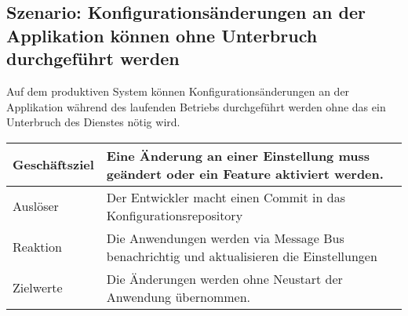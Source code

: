 \subsection{Szenario: Konfigurationsänderungen an der Applikation können ohne Unterbruch durchgeführt werden}

Auf dem produktiven System können Konfigurationsänderungen an der Applikation während des laufenden Betriebs durchgeführt werden ohne das ein Unterbruch des Dienstes nötig wird.

\begin{table}[H]
	\centering
	\begin{tabular}{ | p{3cm} | p{11cm} | }
		\toprule
		Geschäftsziel & Eine Änderung an einer Einstellung muss geändert oder ein Feature aktiviert werden. \\ \hline
		Auslöser & Der Entwickler macht einen Commit in das Konfigurationsrepository\\ \hline
		Reaktion & Die Anwendungen werden via Message Bus benachrichtig und aktualisieren die Einstellungen \\ \hline
		Zielwerte & Die Änderungen werden ohne Neustart der Anwendung übernommen.\\
		\bottomrule
	\end{tabular}
\end{table}
